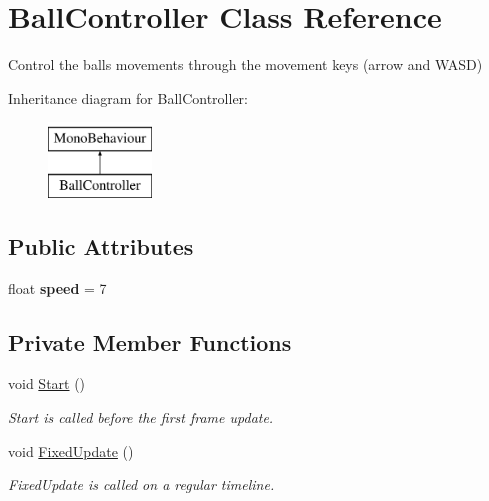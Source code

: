 \hypertarget{class_ball_controller}{}\section{Ball\+Controller Class Reference}
\label{class_ball_controller}


Control the ball\textquotesingle{}s movements through the movement keys (arrow and W\+A\+SD)  


Inheritance diagram for Ball\+Controller\+:\begin{figure}[H]
\begin{center}
\leavevmode
\includegraphics[height=2.000000cm]{class_ball_controller}
\end{center}
\end{figure}
\subsection*{Public Attributes}
\begin{DoxyCompactItemize}
\item 
\mbox{\label{class_ball_controller_a2e97136673efb472bdc55f5ed6d461e5}} 
float {\bfseries speed} = 7
\end{DoxyCompactItemize}
\subsection*{Private Member Functions}
\begin{DoxyCompactItemize}
\item 
void \mbox{\hyperlink{class_ball_controller_a242683fa6f5b6282cb88b38312d4798a}{Start}} ()
\begin{DoxyCompactList}\small\item\em Start is called before the first frame update. \end{DoxyCompactList}\item 
void \mbox{\hyperlink{class_ball_controller_ae0868b9bae107709e252c86d436c907e}{Fixed\+Update}} ()
\begin{DoxyCompactList}\small\item\em Fixed\+Update is called on a regular timeline. \end{DoxyCompactList}\end{DoxyCompactItemize}
